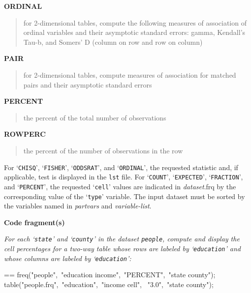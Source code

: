 \documentclass{book}
\makeatletter
\newcommand\Texinfocommandstyletextvar[1]{{\normalfont{}\textsl{#1}}}%
\newenvironment{Texinfopreformatted}{%
  \par\GNUTobeylines\obeyspaces\frenchspacing\parskip=\z@\parindent=\z@}{}
{\catcode`\^^M=13 \gdef\GNUTobeylines{\catcode`\^^M=13 \def^^M{\null\par}}}
\newenvironment{Texinfoindented}{\begin{list}{}{}\item\relax}{\end{list}}
\renewcommand{\_}{\Texinfounderscore\discretionary{}{}{}}
\makeatother
\begin{document}
\textbf{ORDINAL}
%
%
%
%
%
\begin{quote}
for 2-dimensional tables, compute the following measures of association of ordinal variables and their asymptotic standard errors: gamma, Kendall's Tau-b, and Somers' D (column on row and row on column)
\end{quote}

\textbf{PAIR}
\begin{quote}
for 2-dimensional tables, compute measures of association for matched pairs and
their asymptotic standard errors
\end{quote}
%

\textbf{PERCENT}
\begin{quote}
the percent of the total number of observations
\end{quote}
%

\textbf{ROWPERC}
\begin{quote}
the percent of the number of observations in the row
\end{quote}
%
%

For `\texttt{CHISQ}', `\texttt{FISHER}', `\texttt{ODDSRAT}', and `\texttt{ORDINAL}',
the requested statistic and, if applicable, test is displayed in the \texttt{lst} file.
For `\texttt{COUNT}', `\texttt{EXPECTED}', `\texttt{FRACTION}', and `\texttt{PERCENT}',
the requested `\texttt{\_cell\_}' values are indicated in
\Texinfocommandstyletextvar{dataset}.frq by the corresponding value of the `\texttt{\_type\_}' variable.
The input dataset must be sorted by the variables named in
\Texinfocommandstyletextvar{partvars} and \Texinfocommandstyletextvar{variable-list}.

\noindent{}\textbf{Code fragment(s)}

\emph{For each `\texttt{state}' and `\texttt{county}' in
the dataset \texttt{people}, compute and display the cell
percentages for a two-way table whose rows are labeled by
`\texttt{education}' and whose columns are labeled by `\texttt{education}':}
\begin{Texinfoindented}
\begin{Texinfopreformatted}%
\ttfamily freq("people",\ "education income",\ "PERCENT",\ "state county");
table("people.frq",\ "education",\ "income \_cell\_",
\                                             "3.0",\ "state county");
\end{Texinfopreformatted}
\end{Texinfoindented}
\end{document}
